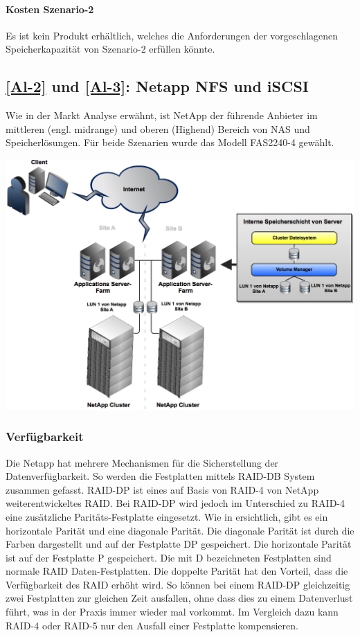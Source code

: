 \paragraph*{Kosten Szenario-2}
Es ist kein Produkt erhältlich, welches die Anforderungen der vorgeschlagenen Speicherkapazität von Szenario-2 erfüllen könnte.

\subsection{\ref{Al-2} und \ref{Al-3}: Netapp NFS und iSCSI}

Wie in der Markt Analyse erwähnt, ist NetApp der führende Anbieter im mittleren (engl. midrange) und oberen (Highend) Bereich von NAS und Speicherlösungen. Für beide Szenarien wurde das Modell FAS2240-4 gewählt. 

\begin{center}
\includegraphics[width=\linewidth, keepaspectratio = true]{media/NetAppISCSI.png}
\end{center}


\subsubsection*{Verfügbarkeit}
Die Netapp hat mehrere Mechanismen für die Sicherstellung der Datenverfügbarkeit. So werden die Festplatten mittels RAID-DB System zusammen gefasst. RAID-DP ist eines auf Basis von RAID-4 von NetApp weiterentwickeltes RAID. Bei RAID-DP wird jedoch im Unterschied zu RAID-4 eine zusätzliche Paritäts-Festplatte eingesetzt. Wie in  ersichtlich, gibt es ein horizontale Parität und eine diagonale Parität. Die diagonale Parität ist durch die Farben dargestellt und auf der Festplatte DP gespeichert. Die horizontale Parität ist auf der Festplatte P gespeichert. Die mit D bezeichneten Festplatten sind normale RAID Daten-Festplatten. Die doppelte Parität hat den Vorteil, dass die Verfügbarkeit des RAID erhöht wird. So können bei einem RAID-DP gleichzeitig zwei Festplatten zur gleichen Zeit ausfallen, ohne dass dies zu einem Datenverlust führt, was in der Praxis immer wieder mal vorkommt. Im Vergleich dazu kann RAID-4 oder RAID-5 nur den Ausfall einer Festplatte kompensieren. \cite{White2010}

